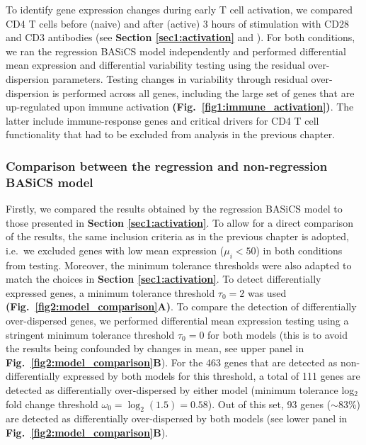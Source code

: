 To identify gene expression changes during early T cell activation, we compared CD4\plus{} T cells before (naive) and after (active) 3 hours of stimulation with CD28 and CD3\textepsilon{} antibodies (see \textbf{Section \ref{sec1:activation}} and \citep{Martinez-jimenez2017}). 
For both conditions, we ran the regression BASiCS model independently and performed differential mean expression and differential variability testing using the residual over-dispersion parameters. 
Testing changes in variability through residual over-dispersion is performed across all genes, including the large set of genes that are up-regulated upon immune activation \textbf{(Fig.~\ref{fig1:immune_activation})}. 
The latter include immune-response genes and critical drivers for CD4\plus{} T cell functionality that had to be excluded from analysis in the previous chapter.

\subsubsection{Comparison between the regression and non-regression BASiCS model}

Firstly, we compared the results obtained by the regression BASiCS model to those presented in \textbf{Section \ref{sec1:activation}}.  
To allow for a direct comparison of the results, the same inclusion criteria as in the previous chapter is adopted, i.e.~we excluded genes with low mean expression ($\mu_i<50$) in both conditions from testing. 
Moreover, the minimum tolerance thresholds were also adapted to match the choices in \textbf{Section \ref{sec1:activation}}. 
To detect differentially expressed genes, a minimum tolerance threshold $\tau_0 = 2$ was used \textbf{(Fig.~\ref{fig2:model_comparison}A)}. 
To compare the detection of differentially over-dispersed genes, we performed differential mean expression testing using a stringent minimum tolerance threshold $\tau_0 = 0$ for both models (this is to avoid the results being confounded by changes in mean, see upper panel in \textbf{Fig.~\ref{fig2:model_comparison}B}). 
For the 463 genes that are detected as non-differentially expressed by both models for this threshold, a total of 111 genes are detected as differentially over-dispersed by either model (minimum tolerance log$_2$ fold change threshold $\omega_0 = \log_2(1.5) = 0.58$). 
Out of this set, 93 genes ($\sim$83\%) are detected as differentially over-dispersed by both models (see lower panel in \textbf{Fig.~\ref{fig2:model_comparison}B}).

